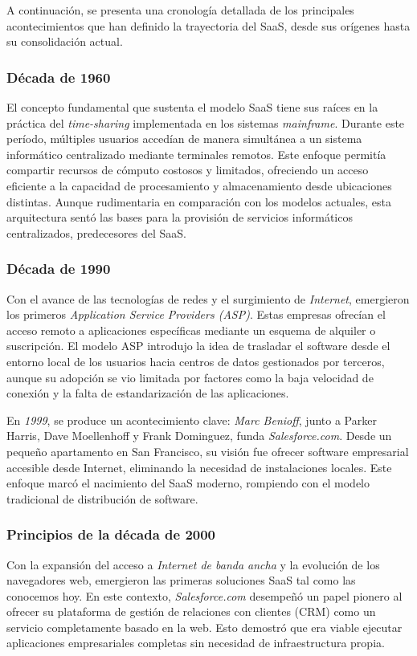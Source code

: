 {            A continuación, se presenta una cronología detallada de los principales acontecimientos que han definido la trayectoria del SaaS, desde sus orígenes hasta su consolidación actual.
                
            \subsubsection{Década de 1960}
                El concepto fundamental que sustenta el modelo SaaS tiene sus raíces en la práctica del \textit{time-sharing} implementada en los sistemas \textit{mainframe}. Durante este período, múltiples usuarios accedían de manera simultánea a un sistema informático centralizado mediante terminales remotos. Este enfoque permitía compartir recursos de cómputo costosos y limitados, ofreciendo un acceso eficiente a la capacidad de procesamiento y almacenamiento desde ubicaciones distintas. Aunque rudimentaria en comparación con los modelos actuales, esta arquitectura sentó las bases para la provisión de servicios informáticos centralizados, predecesores del SaaS.
                
            \subsubsection{Década de 1990}
                Con el avance de las tecnologías de redes y el surgimiento de \textit{Internet}, emergieron los primeros \textit{Application Service Providers (ASP)}. Estas empresas ofrecían el acceso remoto a aplicaciones específicas mediante un esquema de alquiler o suscripción. El modelo ASP introdujo la idea de trasladar el software desde el entorno local de los usuarios hacia centros de datos gestionados por terceros, aunque su adopción se vio limitada por factores como la baja velocidad de conexión y la falta de estandarización de las aplicaciones.
                
                En \textit{1999}, se produce un acontecimiento clave: \textit{Marc Benioff}, junto a Parker Harris, Dave Moellenhoff y Frank Dominguez, funda \textit{Salesforce.com}. Desde un pequeño apartamento en San Francisco, su visión fue ofrecer software empresarial accesible desde Internet, eliminando la necesidad de instalaciones locales. Este enfoque marcó el nacimiento del SaaS moderno, rompiendo con el modelo tradicional de distribución de software.
                
            \subsubsection{Principios de la década de 2000}
                Con la expansión del acceso a \textit{Internet de banda ancha} y la evolución de los navegadores web, emergieron las primeras soluciones SaaS tal como las conocemos hoy. En este contexto, \textit{Salesforce.com} desempeñó un papel pionero al ofrecer su plataforma de gestión de relaciones con clientes (CRM) como un servicio completamente basado en la web. Esto demostró que era viable ejecutar aplicaciones empresariales completas sin necesidad de infraestructura propia.
                
}
